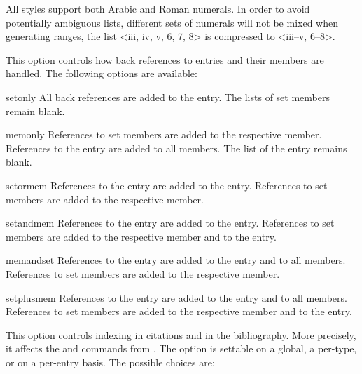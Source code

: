 \documentclass{ltxdockit}[2011/03/25]
\begin{document}
\begin{optionlist}
\begin{valuelist}
\end{valuelist}

All styles support both Arabic and Roman numerals. In order to avoid potentially ambiguous lists, different sets of numerals will not be mixed when generating ranges, \eg the list <iii, iv, v, 6, 7, 8> is compressed to <iii--v, 6--8>.


This option controls how back references to  entries and their members are handled. The following options are available:

\begin{valuelist}

\item[setonly] All back references are added to the  entry. The  lists of set members remain blank.

\item[memonly] References to set members are added to the respective member. References to the  entry are added to all members. The  list of the  entry remains blank.

\item[setormem] References to the  entry are added to the  entry. References to set members are added to the respective member.

\item[setandmem] References to the  entry are added to the  entry. References to set members are added to the respective member and to the  entry.

\item[memandset] References to the  entry are added to the  entry and to all members. References to set members are added to the respective member.

\item[setplusmem] References to the  entry are added to the  entry and to all members. References to set members are added to the respective member and to the  entry.

\end{valuelist}


This option controls indexing in citations and in the bibliography. More precisely, it affects the  and  commands from . The option is settable on a global, a per-type, or on a per-entry basis. The possible choices are:


\end{optionlist}
\end{document}
